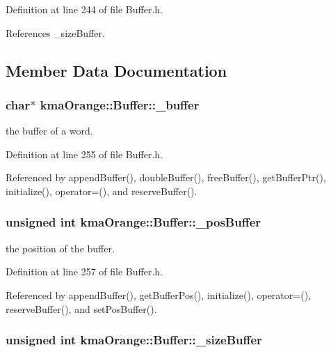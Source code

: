 Definition at line 244 of file Buffer.h.

References \_\-sizeBuffer.

\subsection{Member Data Documentation}
\hypertarget{classkmaOrange_1_1Buffer_ba8240e4cf81f0878217f8350ca3dae6}{
\subsubsection[{\_\-buffer}]{\setlength{\rightskip}{0pt plus 5cm}char$\ast$ {\bf kmaOrange::Buffer::\_\-buffer}}}
\label{classkmaOrange_1_1Buffer_ba8240e4cf81f0878217f8350ca3dae6}


the buffer of a word. 



Definition at line 255 of file Buffer.h.

Referenced by appendBuffer(), doubleBuffer(), freeBuffer(), getBufferPtr(), initialize(), operator=(), and reserveBuffer().\hypertarget{classkmaOrange_1_1Buffer_f4bb54f6fd24ec09040b1e7f54ee3167}{
\subsubsection[{\_\-posBuffer}]{\setlength{\rightskip}{0pt plus 5cm}unsigned int {\bf kmaOrange::Buffer::\_\-posBuffer}}}
\label{classkmaOrange_1_1Buffer_f4bb54f6fd24ec09040b1e7f54ee3167}


the position of the buffer. 



Definition at line 257 of file Buffer.h.

Referenced by appendBuffer(), getBufferPos(), initialize(), operator=(), reserveBuffer(), and setPosBuffer().\hypertarget{classkmaOrange_1_1Buffer_9802c22c40425c9588b33a59cc9f7636}{
\subsubsection[{\_\-sizeBuffer}]{\setlength{\rightskip}{0pt plus 5cm}unsigned int {\bf kmaOrange::Buffer::\_\-sizeBuffer}}}
\label{classkmaOrange_1_1Buffer_9802c22c40425c9588b33a59cc9f7636}



